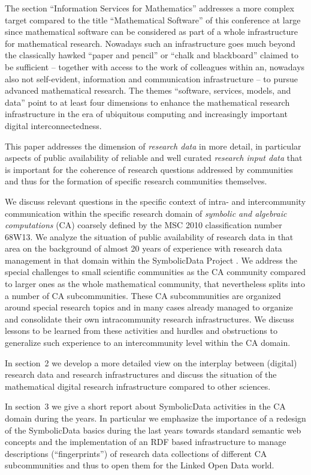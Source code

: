 \documentclass[runningheads,a4paper]{llncs}
\newcommand{\SD}{{\sc Symbo\-lic\-Data}}
\begin{document}
The section ``Information Services for Mathematics'' addresses a more complex
target compared to the title ``Mathematical Software'' of this conference at
large since mathematical software can be considered as part of a whole
infrastructure for mathematical research. Nowadays such an infrastructure goes
much beyond the classically hawked ``paper and pencil'' or ``chalk and
blackboard'' claimed to be sufficient -- together with access to the work of
colleagues within an, nowadays also not self-evident, information and
communication infrastructure -- to pursue advanced mathematical research.  The
themes ``software, services, models, and data'' point to at least four
dimensions to enhance the mathematical research infrastructure in the era of
ubiquitous computing and increasingly important digital interconnectedness.

This paper addresses the dimension of \emph{research data} in more detail, in
particular aspects of public availability of reliable and well curated
\emph{research input data} that is important for the coherence of research
questions addressed by communities and thus for the formation of specific
research communities themselves. 

We discuss relevant questions in the specific context of intra- and
intercommunity communication within the specific research domain of
\emph{symbolic and algebraic computations} (CA) coarsely defined by the MSC
2010 classification number 68W13.  We analyze the situation of public
availability of research data in that area on the background of almost 20 years
of experience with research data management in that domain within the {\SD}
Project \cite{sdwiki}.  We address the special challenges to small scientific
communities as the CA community compared to larger ones as the whole
mathematical community, that nevertheless splits into a number of CA
subcommunities. These CA subcommunities are organized around special research
topics and in many cases already managed to organize and consolidate their own
intracommunity research infrastructures. We discuss lessons to be learned from
these activities and hurdles and obstructions to generalize such experience to
an intercommunity level within the CA domain.

In section~2 we develop a more detailed view on the interplay between (digital)
research data and research infrastructures and discuss the situation of the
mathematical digital research infrastructure compared to other sciences. 

In section~3 we give a short report about {\SD} activities in the CA domain
during the years. In particular we emphasize the importance of a redesign of
the {\SD} basics during the last years towards standard semantic web concepts
and the implementation of an RDF based infrastructure to manage descriptions
(``fingerprints'') of research data collections of different CA subcommunities
and thus to open them for the Linked Open Data world. 
\end{document}
